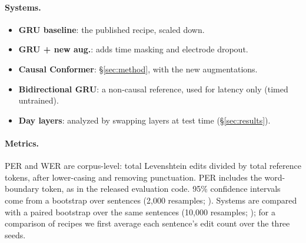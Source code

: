 \paragraph{Systems.}
\begin{itemize}\itemsep0pt
\item \textbf{GRU baseline}: the published recipe, scaled down.
\item \textbf{GRU + new aug.}: adds time masking and electrode dropout.
\item \textbf{Causal Conformer}: \S\ref{sec:method}, with the new augmentations.
\item \textbf{Bidirectional GRU}: a non-causal reference, used for latency only (timed untrained).
\item \textbf{Day layers}: analyzed by swapping layers at test time (\S\ref{sec:results}).
\end{itemize}

\paragraph{Metrics.} PER and WER are corpus-level: total Levenshtein edits divided by total reference tokens, after lower-casing and removing punctuation. PER includes the word-boundary token, as in the released evaluation code. 95\% confidence intervals come from a bootstrap over sentences (2{,}000 resamples; \citealp{bisani2004bootstrap}). Systems are compared with a paired bootstrap over the same sentences (10{,}000 resamples; \citealp{koehn2004significance}); for a comparison of recipes we first average each sentence's edit count over the three seeds.
